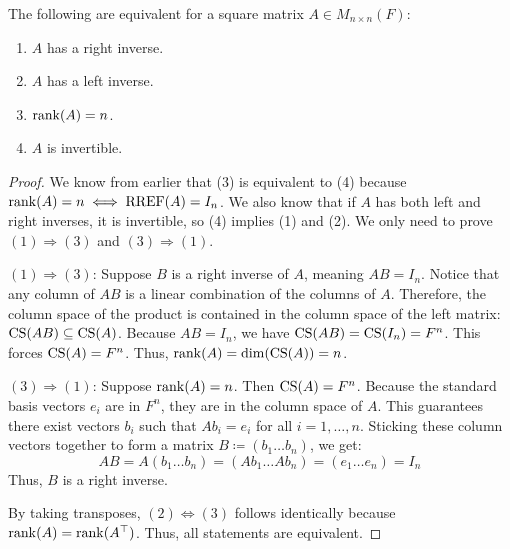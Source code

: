 \documentclass[../linear_algebra_and_groups.tex]{subfiles}
\begin{document}
\begin{theorem}
    \begin{shaded*}
        The following are equivalent for a square matrix $A\in M_{n\times n}(F)$:
        \begin{enumerate}
            \item $A$ has a right inverse.
            \item $A$ has a left inverse.
            \item $\operatorname{rank}(A)=n$.
            \item $A$ is invertible.
        \end{enumerate}
    \end{shaded*}
\end{theorem}
\begin{proof}
    We know from earlier that (3) is equivalent to (4) because $\operatorname{rank}(A)=n \iff \text{RREF}(A)=I_n$. We also know that if $A$ has both left and right inverses, it is invertible, so (4) implies (1) and (2). We only need to prove $(1) \Rightarrow (3)$ and $(3) \Rightarrow (1)$.
    
    \textit{$(1) \Rightarrow (3)$}: Suppose $B$ is a right inverse of $A$, meaning $AB = I_n$. Notice that any column of $AB$ is a linear combination of the columns of $A$. Therefore, the column space of the product is contained in the column space of the left matrix: $\operatorname{CS}(AB) \subseteq \operatorname{CS}(A)$.
    Because $AB = I_n$, we have $\operatorname{CS}(AB) = \operatorname{CS}(I_n) = F^n$. This forces $\operatorname{CS}(A) = F^n$. Thus, $\operatorname{rank}(A) = \dim(\operatorname{CS}(A)) = n$.
    
    \textit{$(3) \Rightarrow (1)$}: Suppose $\operatorname{rank}(A)=n$. Then $\operatorname{CS}(A)=F^n$. Because the standard basis vectors $e_i$ are in $F^n$, they are in the column space of $A$. This guarantees there exist vectors $b_i$ such that $Ab_i = e_i$ for all $i = 1, \dots, n$. 
    Sticking these column vectors together to form a matrix $B \coloneqq (b_1 \dots b_n)$, we get:
    \[ AB = A(b_1 \dots b_n) = (Ab_1 \dots Ab_n) = (e_1 \dots e_n) = I_n \]
    Thus, $B$ is a right inverse.
    
    By taking transposes, $(2) \iff (3)$ follows identically because $\operatorname{rank}(A) = \operatorname{rank}(A^\top)$. Thus, all statements are equivalent.
    \qedhere
\end{proof}
\end{document}
